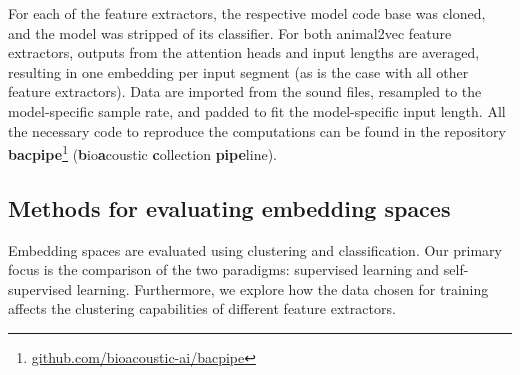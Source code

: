 For each of the feature extractors, the respective model code base was cloned, and the model was stripped of its classifier.
For both animal2vec feature extractors, outputs from the attention heads and input lengths are averaged, resulting in one embedding per input segment (as is the case with all other feature extractors).
Data are imported from the sound files, resampled to the model-specific sample rate, and padded to fit the model-specific input length.
All the necessary code to reproduce the computations can be found in the repository \textbf{bacpipe}\footnote{\url{github.com/bioacoustic-ai/bacpipe}} (\textbf{b}io\textbf{a}coustic \textbf{c}ollection \textbf{pipe}line).

\subsection{Methods for evaluating embedding spaces}
\label{ssub:eval_dim_reduc}

Embedding spaces are evaluated using clustering and classification.
Our primary focus is the comparison of the two paradigms: supervised learning and self-supervised learning.
Furthermore, we explore how the data chosen for training affects the clustering capabilities of different feature extractors.




